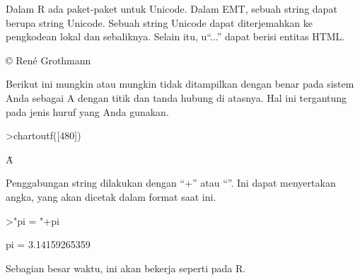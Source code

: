 \documentclass[a4paper,10pt]{article}
\begin{document}
\begin{eulernotebook}
\begin{eulercomment}
\begin{eulercomment}
\begin{eulercomment}
\begin{eulercomment}
\begin{eulercomment}
\begin{eulercomment}
\begin{eulercomment}
\begin{eulercomment}
\begin{eulercomment}
\begin{eulercomment}
\begin{eulercomment}
\begin{eulercomment}
\begin{eulercomment}
\begin{eulercomment}
\begin{eulercomment}
\begin{eulercomment}
\begin{eulercomment}
\begin{eulercomment}
\begin{eulercomment}
\begin{eulercomment}
\begin{eulercomment}
\begin{eulercomment}
\begin{eulercomment}
Dalam R ada paket-paket untuk Unicode. Dalam EMT, sebuah string dapat
berupa string Unicode. Sebuah string Unicode dapat diterjemahkan ke
pengkodean lokal dan sebaliknya. Selain itu, u“...” dapat berisi
entitas HTML.
\end{eulercomment}
\begin{euleroutput}
  © René Grothmann
\end{euleroutput}
\begin{eulercomment}
Berikut ini mungkin atau mungkin tidak ditampilkan dengan benar pada
sistem Anda sebagai A dengan titik dan tanda hubung di atasnya. Hal
ini tergantung pada jenis huruf yang Anda gunakan.
\end{eulercomment}
\begin{eulerprompt}
>chartoutf([480])
\end{eulerprompt}
\begin{euleroutput}
  Ǡ
\end{euleroutput}
\begin{eulercomment}
Penggabungan string dilakukan dengan “+” atau “\textbar{}”. Ini dapat
menyertakan angka, yang akan dicetak dalam format saat ini.
\end{eulercomment}
\begin{eulerprompt}
>"pi = "+pi
\end{eulerprompt}
\begin{euleroutput}
  pi = 3.14159265359
\end{euleroutput}
\begin{eulercomment}
Sebagian besar waktu, ini akan bekerja seperti pada R.


\end{eulercomment}
\end{eulercomment}
\end{eulercomment}
\end{eulercomment}
\end{eulercomment}
\end{eulercomment}
\end{eulercomment}
\end{eulercomment}
\end{eulercomment}
\end{eulercomment}
\end{eulercomment}
\end{eulercomment}
\end{eulercomment}
\end{eulercomment}
\end{eulercomment}
\end{eulercomment}
\end{eulercomment}
\end{eulercomment}
\end{eulercomment}
\end{eulercomment}
\end{eulercomment}
\end{eulercomment}
\end{eulercomment}
\end{eulernotebook}
\end{document}
